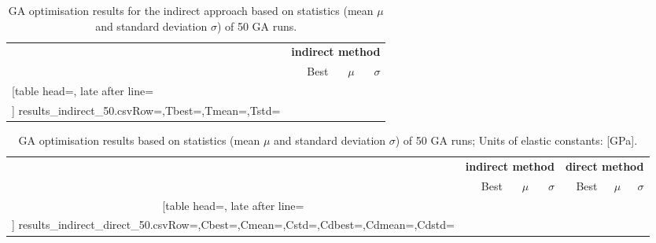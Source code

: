 \documentclass[preprint,12pt]{elsarticle}
\begin{document}

\begin{table}[h]
	\renewcommand{\arraystretch}{1.3}
	\centering \footnotesize
	\caption{GA optimisation results for the indirect approach based on statistics (mean $\mu$ and standard deviation $\sigma$) of 50 GA runs.}	
	\begin{tabular}{lrrr} \toprule
		&\multicolumn{3}{c}{\textbf{indirect method}} \\
		\cmidrule(lr){2-4} 
		&Best & $\mu$ & $\sigma$\\
		\cmidrule(lr){2-4}
		\csvreader[table head=\toprule ,
		late after line=\\ ]%
		{results_indirect_50.csv}{Row=\constantst,Tbest=\tbest,Tmean=\tmean,Tstd=\tstd}%
		{\constantst & \tbest & \tmean & \tstd}%
		\bottomrule
	\end{tabular}	
	\label{tab:csv_indirect_results}
\end{table}

\begin{table}[h]
	\renewcommand{\arraystretch}{1.3}
	\centering \footnotesize
	\caption{GA optimisation results based on statistics (mean $\mu$ and standard deviation $\sigma$) of 50 GA runs; Units of  elastic constants: [GPa].}	
	\begin{tabular}{crrrrrr} \toprule
		&\multicolumn{3}{c}{\textbf{indirect method}} & \multicolumn{3}{c}{\textbf{direct method} }\\
		\cmidrule(lr){2-4} \cmidrule(lr){5-7} 
	&Best & $\mu$ & $\sigma$& Best& $\mu$ & $\sigma$\\
	\cmidrule(lr){2-4} \cmidrule(lr){5-7} 
		\csvreader[table head=\toprule ,
		late after line=\\ ]%
		{results_indirect_direct_50.csv}{Row=\constants,Cbest=\cbest,Cmean=\cmean,Cstd=\cstd,Cdbest=\cdbest,Cdmean=\cdmean,Cdstd=\cdstd}%
		{\constants & \cbest & \cmean & \cstd& \cdbest & \cdmean & \cdstd}%
		\bottomrule
	\end{tabular}	
	\label{tab:csv_results}
\end{table}
\end{document}
